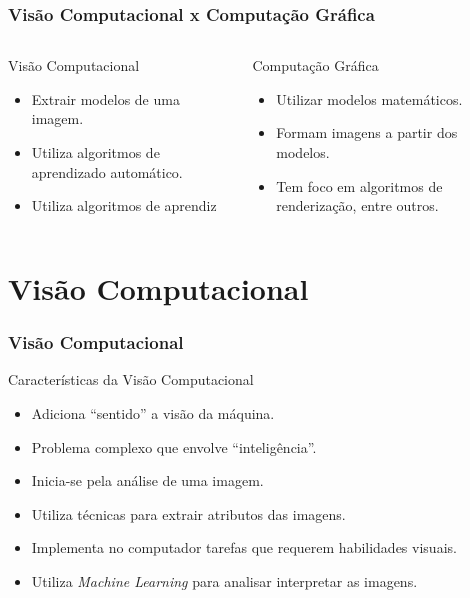 \documentclass{beamer}
\begin{document}
\begin{frame}
\frametitle{Visão Computacional x Computação Gráfica}

 \begin{columns}
    \begin{column}{0.5\textwidth}
      	\begin{block}{Visão Computacional}
			\begin{itemize}
				\item Extrair modelos de uma imagem.
				\item Utiliza algoritmos de aprendizado automático.
				\item Utiliza algoritmos de aprendiz
			\end{itemize}
		\end{block}
    \end{column}
    \begin{column}{0.5\textwidth}
      	\begin{block}{Computação Gráfica}
			\begin{itemize}
				\item Utilizar modelos matemáticos.
				\item Formam imagens a partir dos modelos.
				\item Tem foco em algoritmos de renderização, entre outros.
			\end{itemize}
		\end{block}
    \end{column}
    \end{columns}
	


\end{frame}

\section{Visão Computacional}

\begin{frame}
\frametitle{Visão Computacional}
	\begin{block}{Características da Visão Computacional}
	
		\begin{itemize}
			\item<1-> Adiciona ``sentido'' a visão da máquina.
			\item<2-> Problema complexo que envolve ``inteligência''.
			\item<3-> Inicia-se pela análise de uma imagem. 
			\item<4-> Utiliza técnicas para extrair atributos das imagens.
			\item<5-> Implementa no computador tarefas que requerem habilidades visuais. 
			\item<6-> Utiliza \textit{Machine Learning} para analisar interpretar as imagens.
		\end{itemize}
	\end{block}
\end{frame}
\end{document}
